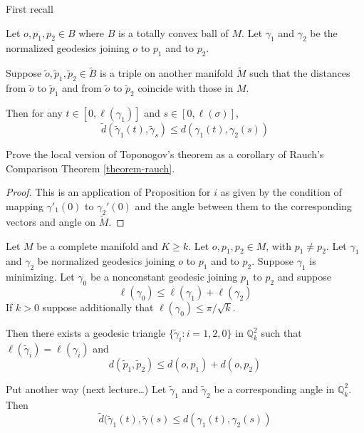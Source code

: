 First recall

\begin{theorem}
\label{theorem-toponogov,local}
Let $o,p_1,p_2 \in B$ where $B$ is a totally convex ball of $M$. Let $\gamma_1$
and $\gamma_2$ be the normalized geodesics joining $o$ to $p_1$ and to $p_2$.

Suppose $\tilde{o}, \tilde{p}_1,\tilde{p}_2 \in \tilde{B}$ is a triple on 
another manifold $\tilde{M}$ such that the distances from $\tilde{o}$ to
$\tilde{p}_1$ and from $\tilde{o}$ to $\tilde{p}_2$ coincide with those in $M$.

Then for any $t \in [0,\ell(\gamma_1)]$ and $s \in [0,\ell(\sigma)]$,
$$
\tilde{d}(\tilde{\gamma}_1(t),\tilde{\gamma}_s)\leq d(\gamma_1(t),\gamma_2(s))
$$
\end{theorem}

\begin{exercise}[Lista 7]
\label{exercise-toponogov-from-rauch}
Prove the local version of Toponogov's theorem as a corollary of Rauch's
Comparison Theorem \ref{theorem-rauch}.
\end{exercise}

\begin{proof}
This is an application of Proposition \label{proposition:contraction} for $i$ as
given by the condition of mapping $\gamma'_1(0)$ to $\gamma_2'(0)$ and the angle
between them to the corresponding vectors and angle on $\tilde{M}$.
\end{proof}

\begin{theorem} \label{theorem-toponogov-hinge}
Let $M$ be a complete manifold and $K \geq k$. Let $o,p_1,p_2 \in M$, with
$p_1\neq  p_2$. Let $\gamma_1$ and $\gamma_2$ be normalized geodesics joining 
$o$ to $p_1$ and to $p_2$. Suppose $\gamma_1$ is minimizing.
Let $\gamma_0$ be a nonconstant geodesic joining $p_1$ to $p_2$ and suppose
$$
\ell(\gamma_0) \leq \ell(\gamma_1) +\ell(\gamma_2)
$$
If $k>0$ suppose additionally that $\ell(\gamma_0) \leq \pi/\sqrt{k}$.

Then there exists a geodesic triangle $\{\tilde{\gamma}_i:i=1,2,0\}$ in
$\mathbb{Q}_k^2$ such that $\ell(\tilde{\gamma}_i) = \ell(\gamma_i)$ and
$$
d(\tilde{p}_1,\tilde{p}_2) \leq  d(o,p_1)+d(o,p_2)
$$

Put another way (next lecture…) Let $\tilde{\gamma}_1$ and $\tilde{\gamma}_2$ 
be a corresponding angle in $\mathbb{Q}_k^2$. Then
$$
\tilde{d}(\tilde{\gamma}_1(t),\tilde{\gamma}(s)\leq d(\gamma_1(t),\gamma_2(s))
$$

\end{theorem}


